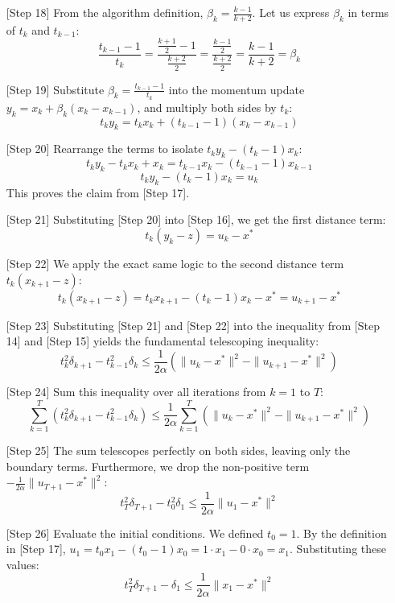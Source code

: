 \documentclass[11pt]{article}
\begin{document}
\begin{itemize}
    \item[{[Step 18]}] From the algorithm definition, $\beta_k = \frac{k-1}{k+2}$. Let us express $\beta_k$ in terms of $t_k$ and $t_{k-1}$:
    $$\frac{t_{k-1} - 1}{t_k} = \frac{\frac{k+1}{2} - 1}{\frac{k+2}{2}} = \frac{\frac{k-1}{2}}{\frac{k+2}{2}} = \frac{k-1}{k+2} = \beta_k$$
    
    \item[{[Step 19]}] Substitute $\beta_k = \frac{t_{k-1} - 1}{t_k}$ into the momentum update $y_k = x_k + \beta_k(x_k - x_{k-1})$, and multiply both sides by $t_k$:
    $$t_k y_k = t_k x_k + (t_{k-1} - 1)(x_k - x_{k-1})$$
    
    \item[{[Step 20]}] Rearrange the terms to isolate $t_k y_k - (t_k - 1)x_k$:
    $$t_k y_k - t_k x_k + x_k = t_{k-1} x_k - (t_{k-1} - 1)x_{k-1}$$
    $$t_k y_k - (t_k - 1)x_k = u_k$$
    This proves the claim from [Step 17].
    
    \item[{[Step 21]}] Substituting [Step 20] into [Step 16], we get the first distance term:
    $$t_k(y_k - z) = u_k - x^*$$
    
    \item[{[Step 22]}] We apply the exact same logic to the second distance term $t_k(x_{k+1} - z)$:
    $$t_k(x_{k+1} - z) = t_k x_{k+1} - (t_k - 1)x_k - x^* = u_{k+1} - x^*$$
    
    \item[{[Step 23]}] Substituting [Step 21] and [Step 22] into the inequality from [Step 14] and [Step 15] yields the fundamental telescoping inequality:
    $$t_k^2 \delta_{k+1} - t_{k-1}^2 \delta_k \le \frac{1}{2\alpha} \left( \|u_k - x^*\|^2 - \|u_{k+1} - x^*\|^2 \right)$$
    
    \item[{[Step 24]}] Sum this inequality over all iterations from $k=1$ to $T$:
    $$\sum_{k=1}^T \left( t_k^2 \delta_{k+1} - t_{k-1}^2 \delta_k \right) \le \frac{1}{2\alpha} \sum_{k=1}^T \left( \|u_k - x^*\|^2 - \|u_{k+1} - x^*\|^2 \right)$$
    
    \item[{[Step 25]}] The sum telescopes perfectly on both sides, leaving only the boundary terms. Furthermore, we drop the non-positive term $-\frac{1}{2\alpha}\|u_{T+1} - x^*\|^2$:
    $$t_T^2 \delta_{T+1} - t_0^2 \delta_1 \le \frac{1}{2\alpha} \|u_1 - x^*\|^2$$
    
    \item[{[Step 26]}] Evaluate the initial conditions. We defined $t_0 = 1$. By the definition in [Step 17], $u_1 = t_0 x_1 - (t_0 - 1)x_0 = 1 \cdot x_1 - 0 \cdot x_0 = x_1$. Substituting these values:
    $$t_T^2 \delta_{T+1} - \delta_1 \le \frac{1}{2\alpha} \|x_1 - x^*\|^2$$
\end{itemize}
\end{document}
